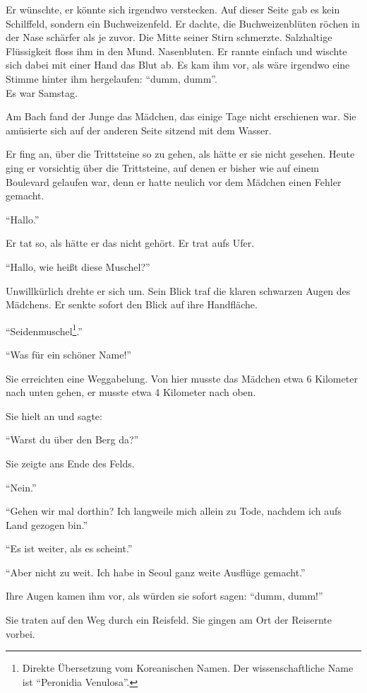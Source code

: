 \documentclass[prd,a4paper,12pt,tightenlines,notitlepage,nofootinbib]{revtex4-1}
\begin{document}
Er wünschte, er könnte sich irgendwo
verstecken.  Auf dieser Seite gab es kein Schilffeld, sondern ein Buchweizenfeld.
Er dachte, die Buchweizenblüten röchen in der Nase schärfer als je
zuvor.  Die Mitte seiner Stirn schmerzte.  Salzhaltige Flüssigkeit floss ihm
in den Mund.  Nasenbluten.  Er rannte einfach und wischte sich dabei
mit einer Hand das Blut ab.  Es kam ihm vor, als wäre irgendwo eine
Stimme hinter ihm hergelaufen: "`dumm, dumm"'.
\\

Es war Samstag.

Am Bach fand der Junge das Mädchen, das einige
Tage nicht erschienen war.
Sie amüsierte sich auf der anderen Seite sitzend mit dem Wasser.

Er fing an, über die Trittsteine so zu gehen, als hätte er sie
nicht gesehen.  Heute ging er vorsichtig über die Trittsteine, auf denen
er bisher wie auf einem Boulevard gelaufen war, denn er hatte neulich vor dem
Mädchen einen Fehler gemacht.

"`Hallo."'

Er tat so, als hätte er das nicht
gehört.  Er trat aufs Ufer.

"`Hallo, wie heißt diese Muschel?"'

Unwillkürlich drehte er sich um.  Sein Blick traf die klaren schwarzen
Augen des Mädchens.  Er senkte sofort den Blick auf ihre Handfläche.

"`Seidenmuschel\footnote{Direkte Übersetzung vom Koreanischen Namen.
  Der wissenschaftliche Name ist "`Peronidia Venulosa"'.}."'

"`Was für ein schöner Name!"'

Sie erreichten eine Weggabelung.
Von hier musste das Mädchen etwa 6 Kilometer nach unten gehen, er musste
etwa 4 Kilometer nach oben.

Sie hielt an und sagte:

"`Warst du über den Berg da?"'

Sie zeigte ans Ende des Felds.

"`Nein."'

"`Gehen wir mal dorthin?
Ich langweile mich allein zu Tode, nachdem ich aufs Land
gezogen bin."'

"`Es ist weiter, als es scheint."'

"`Aber nicht zu weit.
Ich habe in Seoul ganz weite Ausflüge gemacht."'

Ihre Augen kamen ihm
vor, als würden sie sofort sagen: "`dumm, dumm!"'

Sie traten auf den Weg
durch ein Reisfeld.  Sie gingen am Ort der Reisernte vorbei.
\end{document}
